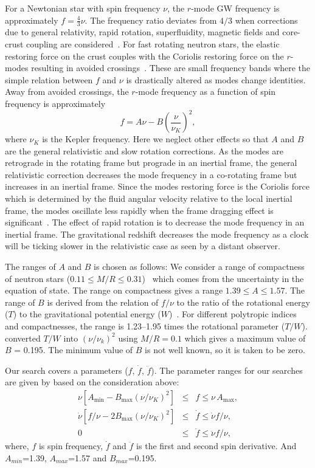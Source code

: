 \documentclass{ttuthes2007}
\begin{document}
For a Newtonian star with spin frequency $\nu$, the $r$-mode \ac{GW} frequency
is approximately $f=\frac{4}{3}\nu$. The frequency ratio deviates from $4/3$
when corrections due to general relativity, rapid rotation, superfluidity,
magnetic fields and core-crust coupling are considered~\cite{Idrisy:2014qca}.
For fast rotating neutron stars, the elastic restoring force on the crust
couples with the Coriolis restoring force on the $r$-modes resulting in avoided
crossings~\cite{Levin_2001}. These are small frequency bands where the simple
relation between $f$ and $\nu$ is drastically altered as modes change identities.
Away from avoided crossings, the $r$-mode frequency as a function of spin
frequency is approximately
\begin{equation}
f=A\nu-B\left(\frac{\nu}{\nu_K}\right)^2, 
\end{equation} 
where $\nu_K$ is the Kepler frequency. Here we neglect other effects so that $A$
and $B$ are the general relativistic and slow rotation corrections.  
As the modes are retrograde in the rotating frame but prograde in an inertial frame,
the general relativistic correction decreases the mode frequency in a co-rotating
frame but increases in an inertial frame. Since the modes restoring force is the 
Coriolis force which is determined by the fluid angular velocity relative to the
local inertial frame, the modes oscillate less
rapidly when the frame dragging effect is
significant~\cite{Lockitch:2000aa,1968ApJ...153..807H}. The effect of rapid
rotation is to decrease the mode frequency in an inertial frame.  The
gravitational redshift decreases the mode frequency as a clock will be ticking
slower in the relativistic case as seen by a distant observer. 

The ranges of $A$ and $B$ is chosen as follows: We consider a range of compactness of
neutron stars ($0.11\leq M/R\leq 0.31$)~\cite{Idrisy:2014qca} which comes from
the uncertainty in the equation of state. The range on compactness gives a range
$1.39\leq A \leq 1.57$. The range of $B$ is derived from the relation of $f/\nu$
to the ratio of the rotational energy ($T$) to the gravitational potential energy
($W$)~\cite{Yoshida:2004gk}. For different polytropic indices and compactnesses,
the range is 1.23--1.95 times the rotational parameter ($T/W$).
\citet{PhysRevD.100.064013}
converted $T/W$ into $(\nu/\nu_k)^2$ using $M/R=0.1$ which gives a maximum
value of $B$ = 0.195. The minimum value of $B$ is not well known, so it is taken
to be zero. 

Our search covers a parameters ($f$, $\dot{f}$, $\ddot{f}$). 
The parameter ranges for our searches are given by \citet{PhysRevD.100.064013} based on
the consideration above:
\begin{eqnarray}
\nu \left[ A_{\min} - B_{\max} \left( \nu/\nu_K \right)^2 \right] & \le & f
\le \nu\, A_{\max},
\\
\dot\nu \left[ f/\nu - 2B_{\max} \left( \nu/\nu_K \right)^2 \right] & \le &
\dot f \le \dot\nu f/\nu,
\\
0 & \le & \ddot f \le \ddot\nu f/\nu,
\end{eqnarray}
where, $f$ is spin frequency, $\dot{f}$ and $\ddot{f}$ is the first and second
spin derivative. And $A_{min}$=1.39, $A_{max}$=1.57 and $B_{max}$=0.195.
\end{document}
